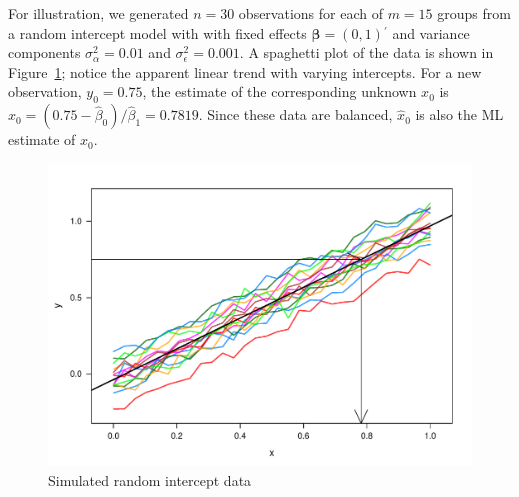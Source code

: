 \documentclass[cmfont,usenames,dvipsnames,leqno]{afit-etd}\usepackage[]{graphicx}\usepackage[]{color}
\makeatletter
\def\maxwidth{ %
  \ifdim\Gin@nat@width>\linewidth
    \linewidth
  \else
    \Gin@nat@width
  \fi
}
\newenvironment{knitrout}{}{} %
\renewenvironment{knitrout}{\begin{singlespace}}{\end{singlespace}}
\newcommand{\trans}{\ensuremath{^\prime}}
\newcommand{\wh}[1]{\ensuremath{\widehat{#1}}}
\newcommand{\var}{\operatorname{Var}}
\makeatother
\begin{document}

For illustration, we generated $n = 30$ observations for each of $m = 15$ groups from a random intercept model with with fixed effects $\bm{\beta} = \left(0, 1\right)\trans$ and variance components $\sigma_\alpha^2 = 0.01$ and $\sigma_\epsilon^2 = 0.001$. A spaghetti plot of the data is shown in Figure~\ref{fig:simdata-scatter}; notice the apparent linear trend with varying intercepts. For a new observation, $y_0 = 0.75$, the estimate of the corresponding unknown $x_0$ is $\wh{x}_0 = \left(0.75 - \wh{\beta}_0\right)/\wh{\beta}_1 = 0.7819$. Since these data are balanced, $\wh{x}_0$ is also the ML estimate of $x_0$. 

\begin{knitrout}
\color{fgcolor}\begin{figure}[H]

\includegraphics[width=\maxwidth]{figure/simdata-scatter} \caption[Scatterplot of simulated random intercept data]{Simulated random intercept data\label{fig:simdata-scatter}}
\end{figure}


\end{knitrout}
\end{document}
